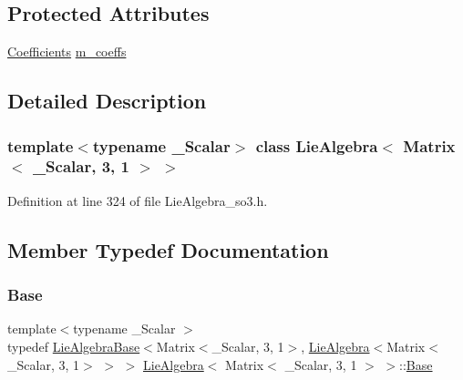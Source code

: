 \subsection*{Protected Attributes}
\begin{DoxyCompactItemize}
\item 
\hyperlink{class_lie_algebra_3_01_matrix_3_01___scalar_00_013_00_011_01_4_01_4_a028504a0d794d492dc47b2edd056fe47}{Coefficients} \hyperlink{class_lie_algebra_3_01_matrix_3_01___scalar_00_013_00_011_01_4_01_4_aeb9883398abbe97d15ce250f5cb214ce}{m\+\_\+coeffs}
\end{DoxyCompactItemize}


\subsection{Detailed Description}
\subsubsection*{template$<$typename \+\_\+\+Scalar$>$\newline
class Lie\+Algebra$<$ Matrix$<$ \+\_\+\+Scalar, 3, 1 $>$ $>$}



Definition at line 324 of file Lie\+Algebra\+\_\+so3.\+h.



\subsection{Member Typedef Documentation}
\hypertarget{class_lie_algebra_3_01_matrix_3_01___scalar_00_013_00_011_01_4_01_4_a4ebe70151a0dade8c902424f217a3451}{}\label{class_lie_algebra_3_01_matrix_3_01___scalar_00_013_00_011_01_4_01_4_a4ebe70151a0dade8c902424f217a3451} 
\subsubsection{\texorpdfstring{Base}{Base}}
{\footnotesize\ttfamily template$<$typename \+\_\+\+Scalar $>$ \\
typedef \hyperlink{class_lie_algebra_base}{Lie\+Algebra\+Base}$<$Matrix$<$\+\_\+\+Scalar, 3, 1$>$, \hyperlink{class_lie_algebra}{Lie\+Algebra}$<$Matrix$<$\+\_\+\+Scalar, 3, 1$>$ $>$ $>$ \hyperlink{class_lie_algebra}{Lie\+Algebra}$<$ Matrix$<$ \+\_\+\+Scalar, 3, 1 $>$ $>$\+::\hyperlink{class_lie_algebra_3_01_matrix_3_01___scalar_00_013_00_011_01_4_01_4_a4ebe70151a0dade8c902424f217a3451}{Base}\hspace{0.3cm}{\ttfamily [protected]}}

